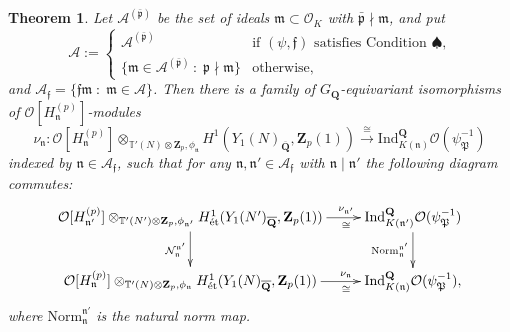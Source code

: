 \documentclass[10pt,letterpaper]{amsart}
\theoremstyle{plain}
\newtheorem{thm}{Theorem}[subsection] %
\theoremstyle{definition}
\theoremstyle{definition}
\theoremstyle{plain}
\theoremstyle{plain}
\theoremstyle{plain}
\theoremstyle{remark}
\numberwithin{equation}{section}
\newcommand{\pp}{\mathfrak{p}}
\newcommand{\ppbar}{\bar{\mathfrak{p}}}
\newcommand{\fkm}{\mathfrak{m}}
\newcommand{\fkf}{\mathfrak{f}}
\newcommand{\fkn}{\mathfrak{n}}
\DeclareMathOperator{\et}{\acute{e}t}
\def\cO{\mathcal O}
\newcommand{\Q}{\mathbf{Q}}
\newcommand{\Z}{\mathbf{Z}}
\begin{document}
\begin{thm}\label{norm1} 
Let $\mathcal{A}^{(\ppbar)}$ be the set of ideals $\fkm\subset\cO_K$  with $\ppbar\nmid\fkm$, and put 
\[
\mathcal{A}:=\begin{cases}
\mathcal{A}^{(\ppbar)}&\textrm{if $(\psi,\fkf)$ satisfies Condition~$\spadesuit$,}\\[0.3em]
\{\fkm\in\mathcal{A}^{(\ppbar)}\,\colon\;\pp\nmid\fkm\}&\textrm{otherwise},
\end{cases}
\]
and $\mathcal{A}_\fkf=\{\fkf\fkm\;\colon\;\fkm\in\mathcal{A}\}$. 
Then there is a family of $G_{\Q}$-equivariant isomorphisms of $\mathcal{O}[H_{\fkn}^{(p)}]$-modules 
\begin{equation*}
    \nu_{\fkn}:\mathcal{O}[H_{\fkn}^{(p)}]\otimes_{\mathbb{T}'(N)\otimes\Z_p,\phi_{\fkn}}H^1_{\et}(Y_1(N)_{\overline{\Q}},\Z_p(1))\overset{\cong}{\longrightarrow}{\mathrm{Ind}}^{\Q}_{K(\fkn)}\mathcal{O}(\psi_{\mathfrak{P}}^{-1})
\end{equation*}
indexed by $\fkn\in \mathcal{A}_{\mathfrak{f}}$, such that for any $\fkn,\fkn'\in \mathcal{A}_\mathfrak{f}$ with $\fkn\mid\fkn'$ the following diagram commutes:
\begin{equation*}
    \xymatrix{
\mathcal{O}[H_{\fkn'}^{(p)}]\otimes_{\mathbb{T}'(N')\otimes\Z_p,\phi_{\fkn'}}H^1_{\et}(Y_1(N')_{\overline{\Q}},\Z_p(1)) \ar[d]_{\mathcal{N}_{\fkn}^{\fkn'}} \ar[r]^(.7){\nu_{\fkn'}}_(.7){\cong} & {\mathrm{Ind}}^{\Q}_{K(\fkn')}\mathcal{O}(\psi_{\mathfrak{P}}^{-1}) \ar[d]_{\mathrm{Norm}_{\fkn}^{\fkn'}} \\
\mathcal{O}[H_{\fkn}^{(p)}]\otimes_{\mathbb{T}'(N)\otimes\Z_p,\phi_{\fkn}}H^1_{\et}(Y_1(N)_{\overline{\Q}},\Z_p(1)) \ar[r]^(.7){ \nu_{\fkn}}_(.7){\cong} & {\mathrm{Ind}}^{\Q}_{K(\fkn)}\mathcal{O}(\psi_{\mathfrak{P}}^{-1}), }
\end{equation*}
where $\mathrm{Norm}_{\fkn}^{\fkn'}$ is the natural norm map.
\end{thm}
\end{document}
